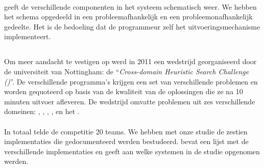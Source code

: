 \paragraph{}
 geeft de verschillende componenten in het \abhf{} systeem schematisch weer. We hebben het schema opgedeeld in een probleemafhankelijk en een probleemonafhankelijk gedeelte. Het is de bedoeling dat de programmeur zelf het uitvoeringsmechanisme implementeert.


\subsection{\abchescy{}}

Om meer aandacht te vestigen op \abhf{} werd in 2011 een wedstrijd georganiseerd door de universiteit van Nottingham: de ``\emph{Cross-domain Heuristic Search Challenge (\abchescy)}''\cite{Burke:2011:CHS:2177360.2177415}. De verschillende programma's krijgen een set van verschillende problemen en worden gequoteerd op basis van de kwaliteit van de oplossingen die ze na 10 minuten uitvoer afleveren.%
De wedstrijd omvatte problemen uit zes verschillende domeinen: , , , ,  en het .

\paragraph{}
In totaal telde de competitie 20 teams. We hebben met onze studie de zestien implementaties die gedocumenteerd werden bestudeerd.  bevat een lijst met de verschillende implementaties en geeft aan welke systemen in de studie opgenomen werden.

